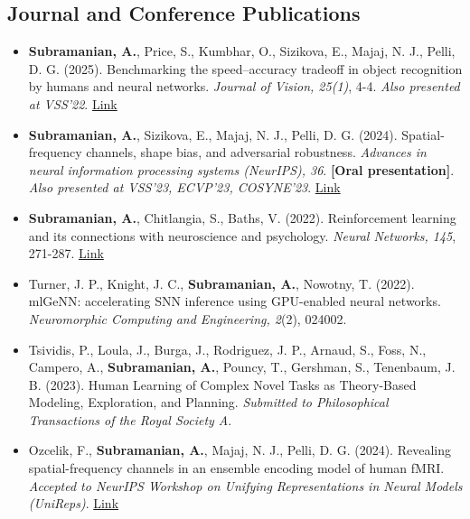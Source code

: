 \documentclass[10pt,letterpaper]{article}
\begin{document}
\subsection*{\Large Journal and Conference Publications}
\begin{itemize}[leftmargin=1em,itemsep=0.3em]

    \item \textbf{Subramanian, A.}, Price, S., Kumbhar, O., Sizikova, E., Majaj, N. J., Pelli, D. G. (2025). Benchmarking the speed–accuracy tradeoff in object recognition by humans and neural networks. \textit{Journal of Vision, 25(1)}, 4-4. \textit{Also presented at VSS'22}. \href{https://doi.org/10.1167/jov.25.1.4}{Link}

    \item \textbf{Subramanian, A.}, Sizikova, E., Majaj, N. J., Pelli, D. G. (2024). Spatial-frequency channels, shape bias, and adversarial robustness. \textit{Advances in neural information processing systems (NeurIPS), 36}. \textbf{[Oral presentation]}. \textit{Also presented at VSS'23, ECVP'23, COSYNE'23}. \href{https://proceedings.neurips.cc/paper_files/paper/2023/hash/0cdc1e85736d9c01d366cbf9b4b81672-Abstract-Conference.html}{Link}

    \item \textbf{Subramanian, A.}, Chitlangia, S., Baths, V. (2022). Reinforcement learning and its connections with neuroscience and psychology. \textit{Neural Networks, 145}, 271-287. \href{https://www.sciencedirect.com/science/article/abs/pii/S0893608021003944}{Link}

    \item Turner, J. P., Knight, J. C., \textbf{Subramanian, A.}, Nowotny, T. (2022). mlGeNN: accelerating SNN inference using GPU-enabled neural networks. \textit{Neuromorphic Computing and Engineering, 2}(2), 024002.

    \item Tsividis, P., Loula, J., Burga, J., Rodriguez, J. P., Arnaud, S., Foss, N., Campero, A., \textbf{Subramanian, A.}, Pouncy, T., Gershman, S., Tenenbaum, J. B. (2023). Human Learning of Complex Novel Tasks as Theory-Based Modeling, Exploration, and Planning. \textit{Submitted to Philosophical Transactions of the Royal Society A}.
    
    \item Ozcelik, F., \textbf{Subramanian, A.}, Majaj, N. J., Pelli, D. G. (2024). Revealing spatial-frequency channels in an ensemble encoding model of human fMRI. \textit{Accepted to NeurIPS Workshop on Unifying Representations in Neural Models (UniReps)}. \href{https://openreview.net/forum?id=O8nVUbyvTC#discussion}{Link}


\end{itemize}
\end{document}
